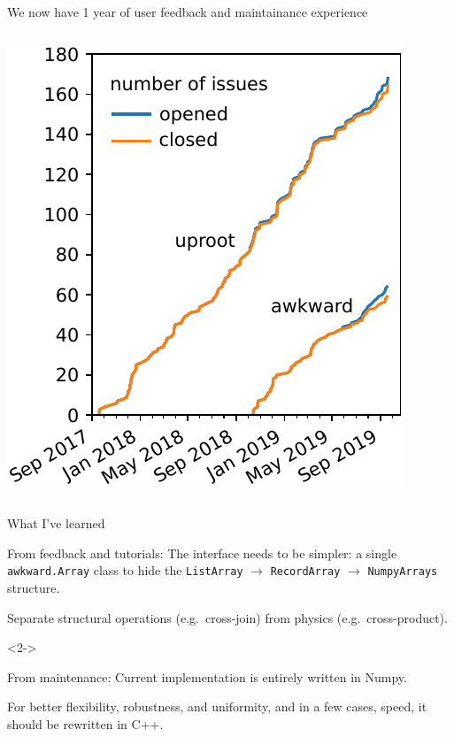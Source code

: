 \documentclass[aspectratio=169]{beamer}
\begin{document}
\begin{frame}{We now have 1 year of user feedback and maintainance experience}
\begin{columns}
\vspace{0.2 cm}
\hspace{-0.25 cm}\includegraphics[width=\linewidth]{uproot-issues.pdf}
\end{columns}
\end{frame}

\begin{frame}{What I've learned}
\large
\vspace{0.5 cm}
\begin{block}{\Large From feedback and tutorials:}
\vspace{0.2 cm}
The interface needs to be simpler: a single \texttt{awkward.Array} class to hide the \texttt{ListArray} $\to$ \texttt{RecordArray} $\to$ \texttt{NumpyArrays} structure.

\vspace{0.2 cm}
Separate structural operations (e.g.\ cross-join) from physics (e.g.\ cross-product).
\end{block}

\vspace{0.5 cm}
\begin{uncoverenv}<2->
\begin{block}{\Large From maintenance:}
\vspace{0.2 cm}
Current implementation is entirely written in Numpy.

\vspace{0.2 cm}
For better flexibility, robustness, and uniformity, and in a few cases, speed, it should be rewritten in C++.
\end{block}
\end{uncoverenv}
\end{frame}
\end{document}
